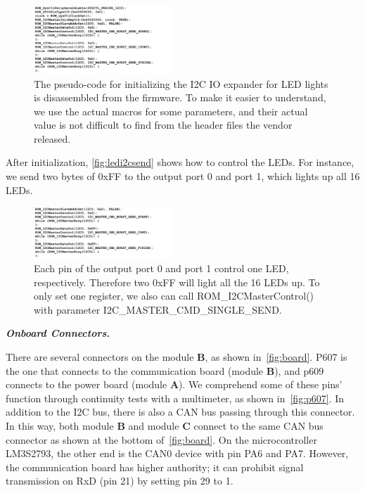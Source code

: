 \begin{figure}[th]
	\includegraphics[width=0.47\textwidth]{figures/ledi2cinit}
	\centering
	\caption{The pseudo-code for initializing the I2C IO expander for LED lights is disassembled from the firmware. To make it easier to understand, we use the actual macros for some parameters, and their actual value is not difficult to find from the header files the vendor released.}
	\label{fig:ledi2cinit}
\end{figure}



After initialization, \autoref{fig:ledi2csend} shows how to control the LEDs. For instance, we send two bytes of 0xFF to the output port 0 and port 1, which lights up all 16 LEDs.


\begin{figure}[th]
	\includegraphics[width=0.47\textwidth]{figures/ledi2csend}
	\centering
	\caption{Each pin of the output port 0 and port 1 control one LED, respectively. Therefore two 0xFF will light all the 16 LEDs up. To only set one register, we also can call  ROM\_I2CMasterControl() with parameter I2C\_MASTER\_CMD\_SINGLE\_SEND.}
	\label{fig:ledi2csend}
\end{figure}





\textbf{\textit{Onboard Connectors.}}

There are several connectors on the module \textbf{B}, as shown in~\autoref{fig:board}. P607 is the one that connects to the communication board (module \textbf{B}), and p609 connects to the power board (module \textbf{A}). We comprehend some of these pins' function through continuity tests with a multimeter, as shown in~\autoref{fig:p607}. In addition to the I2C bus, there is also a CAN bus passing through this connector. In this way, both module \textbf{B} and module \textbf{C} connect to the same CAN bus connector as shown at the bottom of~\autoref{fig:board}. On the microcontroller LM3S2793, the other end is the CAN0 device with pin PA6 and PA7. However, the communication board has higher authority; it can prohibit signal transmission on RxD (pin 21) by setting pin 29 to 1.

